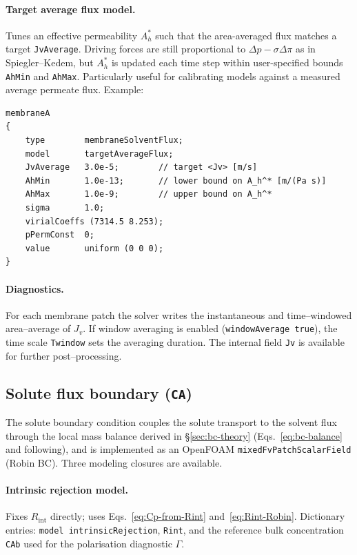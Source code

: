 \documentclass[11pt,a4paper]{article}
\begin{document}
\paragraph{Target average flux model.}
Tunes an effective permeability \(A_h^*\) such that the area-averaged
flux matches a target \texttt{JvAverage}.  Driving forces are still
proportional to \(\Delta p - \sigma\Delta\pi\) as in Spiegler--Kedem,
but \(A_h^*\) is updated each time step within user-specified bounds
\texttt{AhMin} and \texttt{AhMax}.  Particularly useful for calibrating
models against a measured average permeate flux.  Example:
\begin{verbatim}
membraneA
{
    type        membraneSolventFlux;
    model       targetAverageFlux;
    JvAverage   3.0e-5;        // target <Jv> [m/s]
    AhMin       1.0e-13;       // lower bound on A_h^* [m/(Pa s)]
    AhMax       1.0e-9;        // upper bound on A_h^*
    sigma       1.0;
    virialCoeffs (7314.5 8.253);
    pPermConst  0;
    value       uniform (0 0 0);
}
\end{verbatim}

\paragraph{Diagnostics.}
For each membrane patch the solver writes the instantaneous and
time–windowed area–average of \(J_v\).  If window averaging is
enabled (\texttt{windowAverage true}), the time scale \texttt{Twindow}
sets the averaging duration.  The internal field \texttt{Jv} is
available for further post–processing.

\subsection{Solute flux boundary (\texttt{CA})}
\label{sec:bc-solute}
The solute boundary condition couples the solute transport to the
solvent flux through the local mass balance derived in
\S\ref{sec:bc-theory} (Eqs.~\eqref{eq:bc-balance} and following), and
is implemented as an OpenFOAM \texttt{mixedFvPatchScalarField} (Robin
BC). Three modeling closures are available.

\paragraph{Intrinsic rejection model.}
Fixes \(R_\mathrm{int}\) directly; uses Eqs.~\eqref{eq:Cp-from-Rint}
and~\eqref{eq:Rint-Robin}. Dictionary entries: \texttt{model
intrinsicRejection}, \texttt{Rint}, and the reference bulk
concentration \texttt{CAb} used for the polarisation diagnostic
\(\Gamma\).
\end{document}
